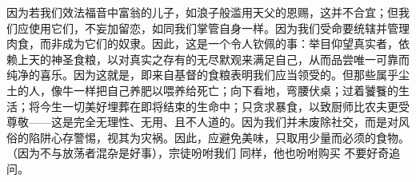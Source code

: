 因为若我们效法福音中富翁的儿子，如浪子般滥用天父的恩赐，这并不合宜；但我们应使用它们，不妄加留恋，如同我们掌管自身一样。因为我们受命要统辖并管理肉食，而非成为它们的奴隶。因此，这是一个令人钦佩的事：举目仰望真实者，依赖上天的神圣食粮，以对真实之存有的无尽默观来满足自己，从而品尝唯一可靠而纯净的喜乐。因为这就是，即来自基督的食粮表明我们应当领受的。但那些属乎尘土的人，像牛一样把自己养肥以喂养给死亡；向下看地，弯腰伏桌；过着饕餮的生活；将今生一切美好埋葬在即将结束的生命中；只贪求暴食，以致厨师比农夫更受尊敬——这是完全无理性、无用、且不人道的。因为我们并未废除社交，而是对风俗的陷阱心存警惕，视其为灾祸。因此，应避免美味，只取用少量而必须的食物。（因为不与放荡者混杂是好事），宗徒吩咐我们  同样，他也吩咐购买 不要好奇追问。\par

